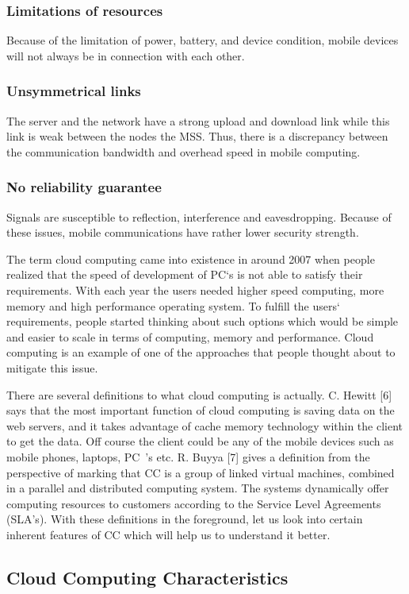 \documentclass[10pt, conference, compsocconf]{IEEEtran}
\begin{document}
\subsubsection{Limitations of resources}
Because of the limitation of power, battery, and device condition, mobile devices will not always be in connection with each other.
\subsubsection{Unsymmetrical links}
The server and the network have a strong upload and download link while this link is weak between the nodes the MSS. Thus, there is a discrepancy between the communication bandwidth and overhead speed in mobile computing.
\subsubsection{No reliability guarantee}
Signals are susceptible to reflection, interference and eavesdropping. Because of these issues, mobile communications have rather lower security strength.

The term cloud computing came into existence in around 2007 when people realized that the speed of development of PC`s is not able to satisfy their requirements. With each year the users needed higher speed computing, more memory and high performance operating system. To fulfill the users` requirements, people started thinking about such options which would be simple and easier to scale in terms of computing, memory and performance. Cloud computing is an example of one of the approaches that people thought about to mitigate this issue.



There are several definitions to what cloud computing is actually. C. Hewitt [6] says that the most important function of cloud computing is saving data on the web servers, and it takes advantage of cache memory technology within the client to get the data. Off course the client could be any of the mobile devices such as mobile phones, laptops, PC~’s etc. R. Buyya [7] gives a definition from the perspective of marking that CC is a group of linked virtual machines, combined in a parallel and distributed computing system. The systems dynamically offer computing resources to customers according to the Service Level Agreements (SLA’s). With these definitions in the foreground, let us look into certain inherent features of CC which will help us to understand it better.

\subsection{Cloud Computing Characteristics}
\end{document}
